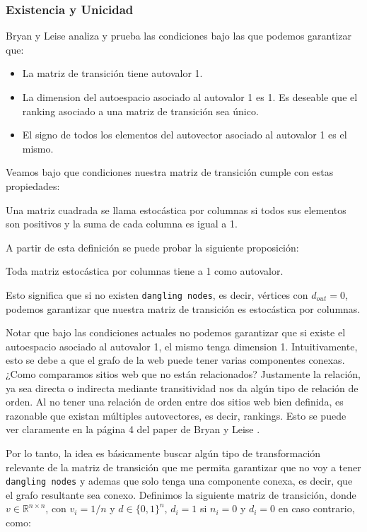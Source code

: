 \pagebreak

\subsubsection{Existencia y Unicidad}

Bryan y Leise \cite{Bryan2006} analiza y prueba las condiciones bajo las que podemos garantizar que:
\begin{itemize}
\item La matriz de transición tiene autovalor 1.
\item La dimension del autoespacio asociado al autovalor 1 es 1. Es deseable que el ranking asociado a una matriz de transición sea único.
\item El signo de todos los elementos del autovector asociado al autovalor 1 es el mismo.
\end{itemize}

Veamos bajo que condiciones nuestra matriz de transición cumple con estas propiedades:

\begin{definition}
Una matriz cuadrada se llama estocástica por columnas si todos sus elementos son positivos y la suma de cada columna es igual a 1.
\end{definition}

A partir de esta definición se puede probar la siguiente proposición:
\begin{proposition}
Toda matriz estocástica por columnas tiene a 1 como autovalor.
\end{proposition}

Esto significa que si no existen \texttt{dangling nodes}, es decir, vértices con $d_{out} = 0$, podemos garantizar que nuestra matriz de transición es estocástica por columnas.

Notar que bajo las condiciones actuales no podemos garantizar que si existe el autoespacio asociado al autovalor 1, el mismo tenga dimension 1. Intuitivamente, esto se debe a que el grafo de la web puede tener varias componentes conexas. ¿Como comparamos sitios web que no están relacionados? Justamente la relación, ya sea directa o indirecta mediante transitividad nos da algún tipo de relación de orden. Al no tener una relación de orden entre dos sitios web bien definida, es razonable que existan múltiples autovectores, es decir, rankings. Esto se puede ver claramente en la página 4 del paper de Bryan y Leise \cite{Bryan2006}.

Por lo tanto, la idea es básicamente buscar algún tipo de transformación relevante de la matriz de transición que me permita garantizar que no voy a tener \texttt{dangling nodes} y ademas que solo tenga una componente conexa, es decir, que el grafo resultante sea conexo. Definimos la siguiente matriz de transición, donde $v \in \mathbb{R}^{n \times n}$, con $v_i = 1 / n$ y $d \in \{0,1\}^n$,  $d_i = 1$ si $n_i = 0$ y $d_i = 0$ en caso contrario, como:

